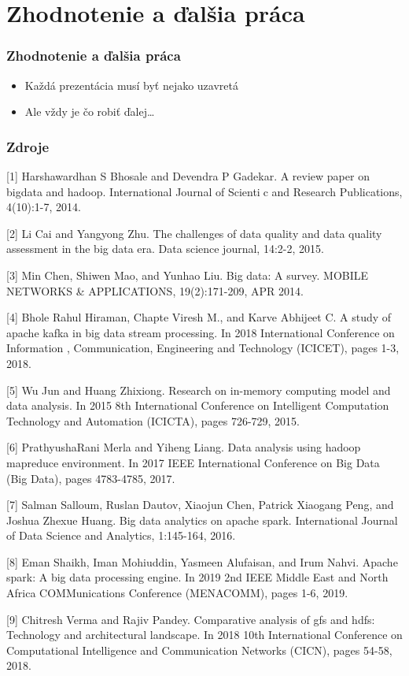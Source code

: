 \documentclass{beamer}
\begin{document}
\section*{Zhodnotenie a ďalšia práca}

\begin{frame}[fragile=singleslide]\frametitle{Zhodnotenie a ďalšia práca}
\begin{itemize}
\item Každá prezentácia musí byť nejako uzavretá
\item Ale vždy je čo robiť ďalej\ldots{}
\end{itemize}
\end{frame}

\begin{frame}[allowframebreaks]
\frametitle{Zdroje}
[1] Harshawardhan S Bhosale and Devendra P Gadekar.
A review paper on bigdata and hadoop.
International Journal of Scientic and Research Publications, 4(10):1-7, 2014.

[2] Li Cai and Yangyong Zhu.
The challenges of data quality and data quality assessment in the big data era.
Data science journal, 14:2-2, 2015.

[3] Min Chen, Shiwen Mao, and Yunhao Liu.
Big data: A survey.
MOBILE NETWORKS \& APPLICATIONS, 19(2):171-209, APR 2014.

[4] Bhole Rahul Hiraman, Chapte Viresh M., and Karve Abhijeet C.
A study of apache kafka in big data stream processing.
In 2018 International Conference on Information , Communication, Engineering and Technology (ICICET), pages 1-3, 2018.

[5] Wu Jun and Huang Zhixiong.
Research on in-memory computing model and data analysis.
In 2015 8th International Conference on Intelligent Computation Technology and Automation (ICICTA), pages 726-729, 2015.

[6] PrathyushaRani Merla and Yiheng Liang.
Data analysis using hadoop mapreduce environment.
In 2017 IEEE International Conference on Big Data (Big Data), pages 4783-4785, 2017.

[7] Salman Salloum, Ruslan Dautov, Xiaojun Chen, Patrick Xiaogang Peng, and Joshua Zhexue Huang.
Big data analytics on apache spark.
International Journal of Data Science and Analytics, 1:145-164, 2016.

[8] Eman Shaikh, Iman Mohiuddin, Yasmeen Alufaisan, and Irum Nahvi.
Apache spark: A big data processing engine.
In 2019 2nd IEEE Middle East and North Africa COMMunications Conference (MENACOMM), pages 1-6, 2019.

[9] Chitresh Verma and Rajiv Pandey.
Comparative analysis of gfs and hdfs: Technology and architectural landscape.
In 2018 10th International Conference on Computational Intelligence and Communication Networks (CICN), pages 54-58, 2018.
\end{frame}
\end{document}
